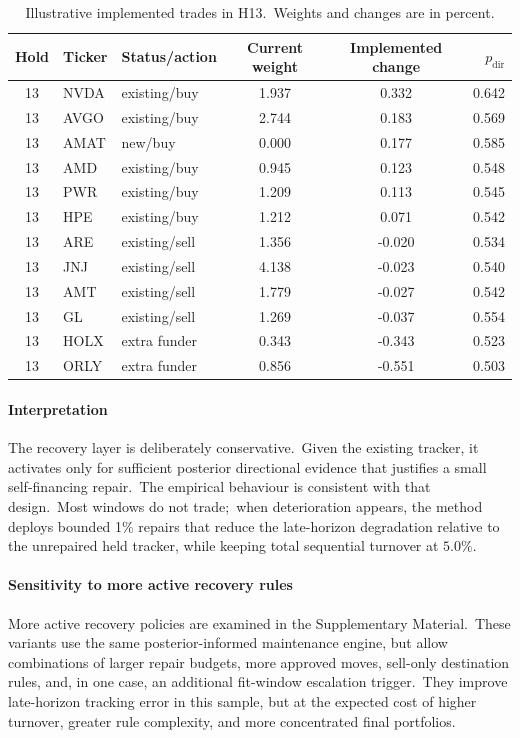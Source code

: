 \documentclass[11pt]{article}
\begin{document}
\begin{table}[htbp]
\centering
\caption{Illustrative implemented trades in H13.\ Weights and changes are in percent.}
\label{tab:example-trades13}
\begin{tabular}{cllccr}
\toprule
Hold & Ticker & Status/action & Current weight & Implemented change & $p_{\mathrm{dir}}$ \\
\midrule
13 & NVDA & existing/buy & 1.937 & 0.332 & 0.642 \\
13 & AVGO & existing/buy & 2.744 & 0.183 & 0.569 \\
13 & AMAT & new/buy & 0.000 & 0.177 & 0.585 \\
13 & AMD & existing/buy & 0.945 & 0.123 & 0.548 \\
13 & PWR & existing/buy & 1.209 & 0.113 & 0.545 \\
13 & HPE & existing/buy & 1.212 & 0.071 & 0.542 \\
13 & ARE & existing/sell & 1.356 & -0.020 & 0.534 \\
13 & JNJ & existing/sell & 4.138 & -0.023 & 0.540 \\
13 & AMT & existing/sell & 1.779 & -0.027 & 0.542 \\
13 & GL & existing/sell & 1.269 & -0.037 & 0.554 \\
13 & HOLX & extra funder & 0.343 & -0.343 & 0.523 \\
13 & ORLY & extra funder & 0.856 & -0.551 & 0.503 \\
\bottomrule
\end{tabular}
\end{table}

\paragraph{Interpretation}

The recovery layer is deliberately conservative.\ Given the existing tracker, it activates only for sufficient posterior directional evidence that justifies a small self-financing repair.\ The empirical behaviour is consistent with that design.\ Most windows do not trade;\ when deterioration appears, the method deploys bounded 1\% repairs that reduce the late-horizon degradation relative to the unrepaired held tracker, while keeping total sequential turnover at $5.0\%$.


\paragraph{Sensitivity to more active recovery rules}
More active recovery policies are examined in the Supplementary Material.\ These variants use the same posterior-informed maintenance engine, but allow combinations of larger repair budgets, more approved moves, sell-only destination rules, and, in one case, an additional fit-window escalation trigger.\ They improve late-horizon tracking error in this sample, but at the expected cost of higher turnover, greater rule complexity, and more concentrated final portfolios.\ 
\end{document}
